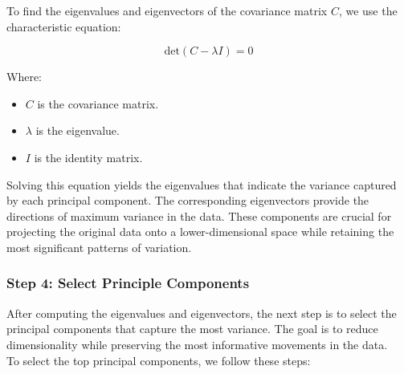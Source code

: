 \documentclass[12pt]{article}
\begin{document}
To find the eigenvalues and eigenvectors of the covariance matrix \(C\), we use the characteristic equation:

\[
\text{det}(C - \lambda I) = 0
\]


Where:
\begin{itemize}
    \item \(C\) is the covariance matrix.
    \item \(\lambda\) is the eigenvalue.
    \item \(I\) is the identity matrix.
\end{itemize}

\vspace{2em}

Solving this equation yields the eigenvalues that indicate the variance captured by each principal component. The corresponding eigenvectors provide the directions of maximum variance in the data. These components are crucial for projecting the original data onto a lower-dimensional space while retaining the most significant patterns of variation.


\subsubsection{Step 4: Select Principle Components}

After computing the eigenvalues and eigenvectors, the next step is to select the principal components that capture the most variance. The goal is to reduce dimensionality while preserving the most informative movements in the data. \\

To select the top principal components, we follow these steps:
\end{document}
